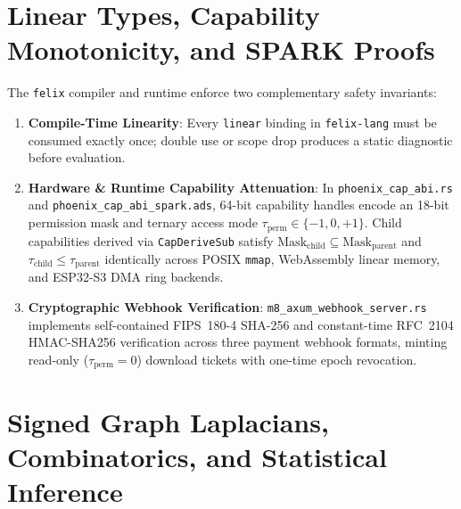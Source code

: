 \documentclass[11pt,a4paper]{article}
\begin{document}
\section{Linear Types, Capability Monotonicity, and SPARK Proofs}

The \texttt{felix} compiler and runtime enforce two complementary safety invariants:
\begin{enumerate}
  \item \textbf{Compile-Time Linearity}: Every \texttt{linear} binding in \texttt{felix-lang} must be consumed exactly once; double use or scope drop produces a static diagnostic before evaluation.
  \item \textbf{Hardware \& Runtime Capability Attenuation}: In \texttt{phoenix\_cap\_abi.rs} and \texttt{phoenix\_cap\_abi\_spark.ads}, 64-bit capability handles encode an 18-bit permission mask and ternary access mode $\tau_{\mathrm{perm}} \in \{-1, 0, +1\}$. Child capabilities derived via \texttt{CapDeriveSub} satisfy $\mathrm{Mask}_{\mathrm{child}} \subseteq \mathrm{Mask}_{\mathrm{parent}}$ and $\tau_{\mathrm{child}} \le \tau_{\mathrm{parent}}$ identically across POSIX \texttt{mmap}, WebAssembly linear memory, and ESP32-S3 DMA ring backends.
  \item \textbf{Cryptographic Webhook Verification}: \texttt{m8\_axum\_webhook\_server.rs} implements self-contained FIPS~180-4 SHA-256 and constant-time RFC~2104 HMAC-SHA256 verification across three payment webhook formats, minting read-only ($\tau_{\mathrm{perm}} = 0$) download tickets with one-time epoch revocation.
\end{enumerate}

\section{Signed Graph Laplacians, Combinatorics, and Statistical Inference}
\end{document}
